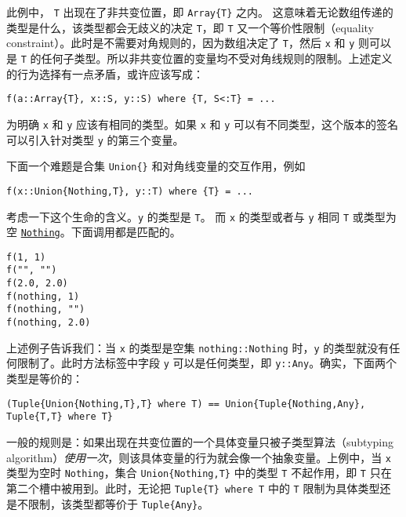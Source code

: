 此例中， \texttt{T} 出现在了非共变位置，即 \texttt{Array\{T\}} 之内。 这意味着无论数组传递的类型是什么，该类型都会无歧义的决定 \texttt{T}，即 \texttt{T} 又一个等价性限制（equality constraint）。此时是不需要对角规则的，因为数组决定了 \texttt{T}，然后 \texttt{x} 和 \texttt{y} 则可以是 \texttt{T} 的任何子类型。所以非共变位置的变量均不受对角线规则的限制。上述定义的行为选择有一点矛盾，或许应该写成：




\begin{verbatim}
f(a::Array{T}, x::S, y::S) where {T, S<:T} = ...
\end{verbatim}



为明确 \texttt{x} 和 \texttt{y} 应该有相同的类型。如果 \texttt{x} 和 \texttt{y} 可以有不同类型，这个版本的签名可以引入针对类型 \texttt{y} 的第三个变量。



下面一个难题是合集 \texttt{Union\{\}} 和对角线变量的交互作用，例如




\begin{verbatim}
f(x::Union{Nothing,T}, y::T) where {T} = ...
\end{verbatim}



考虑一下这个生命的含义。\texttt{y} 的类型是 \texttt{T}。 而 \texttt{x} 的类型或者与 \texttt{y} 相同 \texttt{T} 或类型为空 \hyperlink{13508459519898889544}{\texttt{Nothing}}。下面调用都是匹配的。




\begin{verbatim}
f(1, 1)
f("", "")
f(2.0, 2.0)
f(nothing, 1)
f(nothing, "")
f(nothing, 2.0)
\end{verbatim}



上述例子告诉我们：当 \texttt{x} 的类型是空集 \texttt{nothing::Nothing} 时，\texttt{y} 的类型就没有任何限制了。此时方法标签中字段 \texttt{y} 可以是任何类型，即 \texttt{y::Any}。确实，下面两个类型是等价的：




\begin{verbatim}
(Tuple{Union{Nothing,T},T} where T) == Union{Tuple{Nothing,Any}, Tuple{T,T} where T}
\end{verbatim}



一般的规则是：如果出现在共变位置的一个具体变量只被子类型算法（subtyping algorithm）\emph{使用一次}，则该具体变量的行为就会像一个抽象变量。上例中，当 \texttt{x} 类型为空时 \texttt{Nothing}，集合 \texttt{Union\{Nothing,T\}} 中的类型 \texttt{T} 不起作用，即 \texttt{T} 只在第二个槽中被用到。此时，无论把 \texttt{Tuple\{T\} where T} 中的 \texttt{T} 限制为具体类型还是不限制，该类型都等价于 \texttt{Tuple\{Any\}}。



